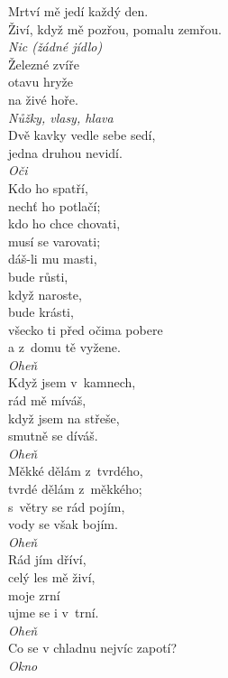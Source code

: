 \begin{multicols}{4}
\noindent
Mrtví mě jedí každý den.\\
Živí, když mě pozřou, pomalu zemřou.\\[1 mm]
{\sl Nic (žádné jídlo)}\\

\noindent
Železné zvíře\\
otavu hryže\\
na živé hoře.\\[1 mm]
{\sl Nůžky, vlasy, hlava}\\

\noindent
Dvě kavky vedle sebe sedí,\\
jedna druhou nevidí.\\[1 mm]
{\sl Oči}\\

\noindent
Kdo ho spatří,\\
nechť ho potlačí;\\
kdo ho chce chovati,\\
musí se varovati;\\
dáš-li mu masti,\\
bude růsti,\\
když naroste,\\
bude krásti,\\
všecko ti před očima pobere\\
a z~domu tě vyžene.\\[1 mm]
{\sl Oheň}\\

\noindent
Když jsem v~kamnech,\\
rád mě míváš,\\
když jsem na střeše,\\
smutně se díváš.\\[1 mm]
{\sl Oheň}\\

\noindent
Měkké dělám z~tvrdého,\\
tvrdé dělám z~měkkého;\\
s~větry se rád pojím,\\
vody se však bojím.\\[1 mm]
{\sl Oheň}\\

\noindent
Rád jím dříví,\\
celý les mě živí,\\
moje zrní\\
ujme se i v~trní.\\[1 mm]
{\sl Oheň}\\

\noindent
Co se v chladnu nejvíc zapotí?\\[1 mm]
{\sl Okno}\\


\end{multicols}

